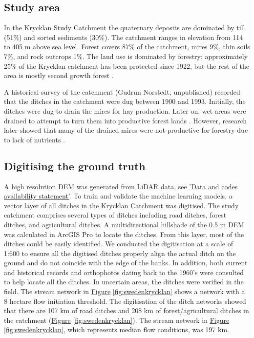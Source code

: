 \documentclass[]{interact}
\theoremstyle{plain}%
\theoremstyle{definition}
\theoremstyle{remark}
\begin{document}
\subsection{Study area}
In the Krycklan Study Catchment the quaternary deposits are dominated by till (51\%) and sorted sediments (30\%). The catchment ranges in elevation from 114 to 405 m above sea level. Forest covers 87\% of the catchment, mires 9\%, thin soils 7\%, and rock outcrops 1\%. The land use is dominated by forestry; approximately 25\% of the Krycklan catchment has been protected since 1922, but  the rest of the area is mostly second growth forest \citep{krycklancatchment}. 

A historical survey of the catchment (Gudrun Norstedt, unpublished) recorded  that the ditches in the catchment were dug between 1900 and 1993. Initially, the ditches were dug to drain the mires for hay production. Later on, wet areas were drained to attempt to turn them into productive forest lands \citep{paivanen}. However, research later showed that many of the drained mires were not productive for forestry due to lack of nutrients \citep{sikstrom}.

\subsection{Digitising the ground truth}
A high resolution DEM was generated from LiDAR data, see \hyperref[lidartodem]{'Data and codes availability statement'}. To train and validate the machine learning models, a vector layer of all ditches in the Krycklan Catchment \citep{krycklancatchment} was digitised. The study catchment comprises several types of ditches including road ditches, forest ditches, and agricultural ditches. A multidirectional hillshade of the 0.5 m DEM was calculated in ArcGIS Pro to locate the ditches. From this layer, most of the ditches could be easily identified. We conducted the digitisation at a scale of 1:600 to ensure all the digitised ditches properly align the actual ditch on the ground and do not coincide with the edge of the banks. In addition, both current and historical records and orthophotos dating back to the 1960's were consulted to help locate all the ditches. In uncertain areas, the ditches were verified in the field. The stream network in \hyperref[fig:swedenkrycklan]{Figure} \ref{fig:swedenkrycklan} shows a network with a 8 hectare flow initiation threshold. The digitisation of the ditch networks showed that there are 107 km of road ditches and 208 km of forest/agricultural ditches in the catchment (\hyperref[fig:swedenkrycklan]{Figure} \ref{fig:swedenkrycklan}). The stream network in \hyperref[fig:swedenkrycklan]{Figure} \ref{fig:swedenkrycklan}, which represents median flow conditions, was 197 km.
\end{document}
